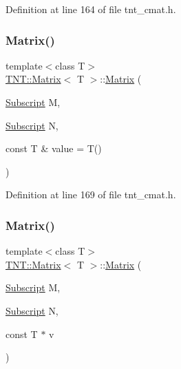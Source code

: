 Definition at line 164 of file tnt\+\_\+cmat.\+h.

\mbox{\label{classTNT_1_1Matrix_ae79fec5ae7648b9971523bcc123af764}} 
\subsubsection{\texorpdfstring{Matrix()}{Matrix()}\hspace{0.1cm}{\footnotesize\ttfamily [3/5]}}
{\footnotesize\ttfamily template$<$class T$>$ \\
\hyperlink{classTNT_1_1Matrix}{T\+N\+T\+::\+Matrix}$<$ T $>$\+::\hyperlink{classTNT_1_1Matrix}{Matrix} (\begin{DoxyParamCaption}\item[{\hyperlink{namespaceTNT_af22e3f1460e145c04ce4e7d701e4c1c1}{Subscript}}]{M,  }\item[{\hyperlink{namespaceTNT_af22e3f1460e145c04ce4e7d701e4c1c1}{Subscript}}]{N,  }\item[{const T \&}]{value = {\ttfamily T()} }\end{DoxyParamCaption})\hspace{0.3cm}{\ttfamily [inline]}}



Definition at line 169 of file tnt\+\_\+cmat.\+h.

\mbox{\label{classTNT_1_1Matrix_ac66034c440243c8ff299c0c0774ad82d}} 
\subsubsection{\texorpdfstring{Matrix()}{Matrix()}\hspace{0.1cm}{\footnotesize\ttfamily [4/5]}}
{\footnotesize\ttfamily template$<$class T$>$ \\
\hyperlink{classTNT_1_1Matrix}{T\+N\+T\+::\+Matrix}$<$ T $>$\+::\hyperlink{classTNT_1_1Matrix}{Matrix} (\begin{DoxyParamCaption}\item[{\hyperlink{namespaceTNT_af22e3f1460e145c04ce4e7d701e4c1c1}{Subscript}}]{M,  }\item[{\hyperlink{namespaceTNT_af22e3f1460e145c04ce4e7d701e4c1c1}{Subscript}}]{N,  }\item[{const T $\ast$}]{v }\end{DoxyParamCaption})\hspace{0.3cm}{\ttfamily [inline]}}



